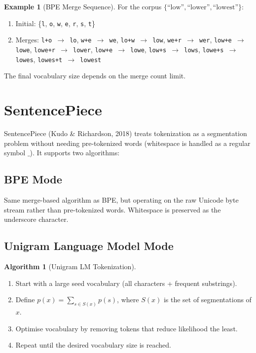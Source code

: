 \documentclass[11pt,a4paper]{book}
\theoremstyle{definition}
\newtheorem{algorithm}{Algorithm}[chapter]
\newtheorem{example}{Example}[chapter]
\begin{document}
\begin{example}[BPE Merge Sequence]
	For the corpus $\{\text{``low''}, \text{``lower''}, \text{``lowest''}\}$:
	\begin{enumerate}
		\item Initial: \{\texttt{l}, \texttt{o}, \texttt{w}, \texttt{e}, \texttt{r}, \texttt{s}, \texttt{t}\}
		\item Merges: \texttt{l+o $\to$ lo}, \texttt{w+e $\to$ we}, \texttt{lo+w $\to$ low}, \texttt{we+r $\to$ wer}, \texttt{low+e $\to$ lowe}, \texttt{lowe+r $\to$ lower}, \texttt{low+e $\to$ lowe}, \texttt{low+s $\to$ lows}, \texttt{lowe+s $\to$ lowes}, \texttt{lowes+t $\to$ lowest}
	\end{enumerate}
	The final vocabulary size depends on the merge count limit.
\end{example}

\section{SentencePiece}

SentencePiece (Kudo \& Richardson, 2018) treats tokenization as a segmentation problem without needing pre-tokenized words (whitespace is handled as a regular symbol $\_$). It supports two algorithms:

\subsection{BPE Mode}

Same merge-based algorithm as BPE, but operating on the raw Unicode byte stream rather than pre-tokenized words. Whitespace is preserved as the underscore character.

\subsection{Unigram Language Model Mode}

\begin{algorithm}[Unigram LM Tokenization]
	\begin{enumerate}
		\item Start with a large seed vocabulary (all characters + frequent substrings).
		\item Define $p(x) = \sum_{s \in S(x)} p(s)$, where $S(x)$ is the set of segmentations of $x$.
		\item Optimise vocabulary by removing tokens that reduce likelihood the least.
		\item Repeat until the desired vocabulary size is reached.
	\end{enumerate}
\end{algorithm}
\end{document}
